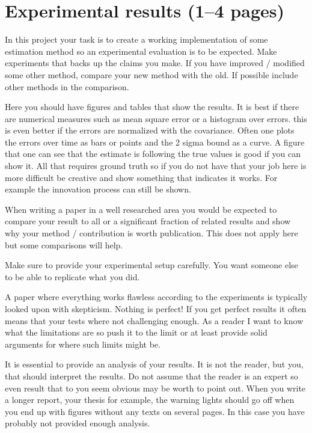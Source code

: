 \documentclass[a4paper,12pt]{article}
\begin{document}
\section{Experimental results (1--4 pages)}
\label{sec:exps}

In this project your task is to create a working implementation of some estimation method so an experimental evaluation is to be expected. Make
experiments that backs up the claims you make. If you have improved /
modified some other method, compare your new method with the old. If
possible include other methods in the comparison.

Here you should have figures and tables that show the results.  It is
best if there are numerical measures such as mean square error or a
histogram over errors.  this is even better if the errors are
normalized with the covariance.  Often one plots the errors over time
as bars or points and the 2 sigma bound as a curve.  A figure that one
can see that the estimate is following the true values is good if you
can show it.  All that requires ground truth so if you do not have
that your job here is more difficult be creative and show something
that indicates it works.  For example the innovation process can still
be shown.

When writing a paper in a well researched area you would be expected
to compare your result to all or a significant fraction of related
results and show why your method / contribution is worth publication.
This does not apply here but some comparisons will help.

Make sure to provide your experimental setup carefully. You want
someone else to be able to replicate what you did.

A paper where everything works flawless according to the experiments
is typically looked upon with skepticism. Nothing is perfect! If you
get perfect results it often means that your tests where not
challenging enough. As a reader I want to know what the limitations
are so push it to the limit or at least provide solid arguments for
where such limits might be.

It is essential to provide an analysis of your results. It is not the
reader, but you, that should interpret the results. Do not assume that
the reader is an expert so even result that to you seem obvious may be
worth to point out. When you write a longer report, your thesis for
example, the warning lights should go off when you end up with figures
without any texts on several pages. In this case you have probably not
provided enough analysis.
\end{document}
